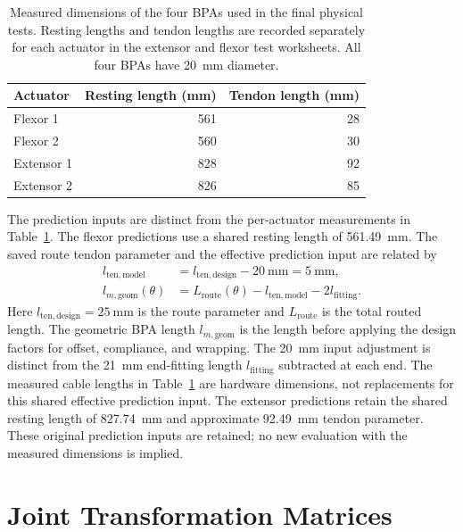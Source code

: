 \begin{table}[htbp]
\centering\small
\caption{Measured dimensions of the four BPAs used in the final physical tests. Resting lengths and tendon lengths are recorded separately for each actuator in the extensor and flexor test worksheets. All four BPAs have \qty{20}{\mm} diameter.}
\label{tab:final_test_dimensions}
\begin{tabular}{lrr}
\toprule
Actuator & Resting length (\unit{\mm}) & Tendon length (\unit{\mm}) \\
\midrule
Flexor 1 & 561 & 28 \\
Flexor 2 & 560 & 30 \\
Extensor 1 & 828 & 92 \\
Extensor 2 & 826 & 85 \\
\bottomrule
\end{tabular}
\end{table}

\FloatBarrier

The prediction inputs are distinct from the per-actuator measurements in Table~\ref{tab:final_test_dimensions}. The flexor predictions use a shared resting length of \qty{561.49}{\mm}. The saved route tendon parameter and the effective prediction input are related by
\begin{equation}
\begin{aligned}
l_{\mathrm{ten,model}} &= l_{\mathrm{ten,design}}-\qty{20}{\mm}=\qty{5}{\mm},\\
l_{m,\mathrm{geom}}(\theta) &= L_{\mathrm{route}}(\theta)-l_{\mathrm{ten,model}}-2l_{\mathrm{fitting}}.
\end{aligned}
\label{eq:app_flexor_tendon_inputs}
\end{equation}
Here $l_{\mathrm{ten,design}}=\qty{25}{\mm}$ is the route parameter and $L_{\mathrm{route}}$ is the total routed length. The geometric BPA length $l_{m,\mathrm{geom}}$ is the length before applying the design factors for offset, compliance, and wrapping. The \qty{20}{\mm} input adjustment is distinct from the \qty{21}{\mm} end-fitting length $l_{\mathrm{fitting}}$ subtracted at each end. The measured cable lengths in Table~\ref{tab:final_test_dimensions} are hardware dimensions, not replacements for this shared effective prediction input. The extensor predictions retain the shared resting length of \qty{827.74}{\mm} and approximate \qty{92.49}{\mm} tendon parameter. These original prediction inputs are retained; no new evaluation with the measured dimensions is implied.

\section{Joint Transformation Matrices}

